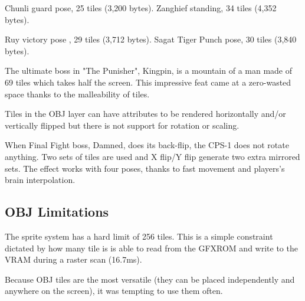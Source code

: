 
Chunli guard pose, 25 tiles (3,200 bytes). Zanghief standing, 34 tiles (4,352 bytes). 

\begin{minipage}[t]{0.3\linewidth}
\end{minipage}%
\hfill%
\begin{minipage}[t]{0.53\linewidth}
\end{minipage}

Ruy victory pose , 29 tiles (3,712 bytes). Sagat Tiger Punch pose, 30 tiles (3,840 bytes). 




The ultimate boss in "The Punisher", Kingpin, is a mountain of a man made of 69 tiles which takes half the screen. This impressive feat came at a zero-wasted space thanks to the malleability of tiles.


Tiles in the OBJ layer can have attributes to be rendered horizontally and/or vertically flipped but there is not support for rotation or scaling.

\begin{minipage}[t]{0.535\linewidth}
\end{minipage}%
\hfill%
\begin{minipage}[t]{0.445\linewidth}
\end{minipage}

 When Final Fight boss, Damned, does its back-flip, the CPS-1 does not rotate anything. Two sets of tiles are used and X flip/Y flip generate two extra mirrored sets. The effect works with four poses, thanks to fast movement and players's brain interpolation.


\pagebreak

\subsection{OBJ Limitations}
The sprite system has a hard limit of 256 tiles. This is a simple constraint dictated by how many tile is is able to read from the GFXROM and write to the VRAM during a raster scan (16.7ms).

Because OBJ tiles are the most versatile (they can be placed independently and anywhere on the screen), it was tempting to use them often.

